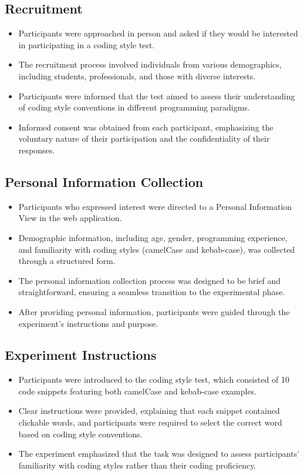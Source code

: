 \documentclass{article}
\begin{document}
\subsection*{Recruitment}

\begin{itemize}
  \item Participants were approached in person and asked if they would be interested in participating in a coding style test.
  \item The recruitment process involved individuals from various demographics, including students, professionals, and those with diverse interests.
  \item Participants were informed that the test aimed to assess their understanding of coding style conventions in different programming paradigms.
  \item Informed consent was obtained from each participant, emphasizing the voluntary nature of their participation and the confidentiality of their responses.
\end{itemize}

\subsection*{Personal Information Collection}

\begin{itemize}
  \item Participants who expressed interest were directed to a Personal Information View in the web application.
  \item Demographic information, including age, gender, programming experience, and familiarity with coding styles (camelCase and kebab-case), was collected through a structured form.
  \item The personal information collection process was designed to be brief and straightforward, ensuring a seamless transition to the experimental phase.
  \item After providing personal information, participants were guided through the experiment's instructions and purpose.
\end{itemize}

\subsection*{Experiment Instructions}

\begin{itemize}
  \item Participants were introduced to the coding style test, which consisted of 10 code snippets featuring both camelCase and kebab-case examples.
  \item Clear instructions were provided, explaining that each snippet contained clickable words, and participants were required to select the correct word based on coding style conventions.
  \item The experiment emphasized that the task was designed to assess participants' familiarity with coding styles rather than their coding proficiency.
\end{itemize}
\end{document}
